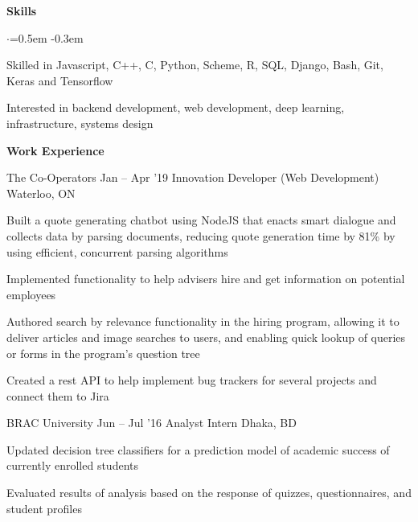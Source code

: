 \documentclass{resume} %
\begin{document}

\begin{rSection}{\textbf{Skills}}
  \vspace {0.3em}
  \begin{list}{$\cdot$}{\leftmargin=0.5em}
    \itemsep -0.3em \vspace{-0.3em}
    \item Skilled in Javascript, C++, C, Python, Scheme, R, SQL, Django, Bash, Git, Keras and Tensorflow
    \item Interested in backend development, web development, deep learning, infrastructure, systems design
  \end{list}
  \vspace{0.3em}
\end{rSection}



\begin{rSection}{\textbf{Work Experience}}
  \begin{rSubsection}{The Co-Operators}
    {Jan -- Apr '19}
         {Innovation Developer (Web Development)}
         {Waterloo, ON}
       \item Built a quote generating chatbot using NodeJS that enacts smart dialogue and collects data by parsing documents, reducing quote generation time by 81\% by using efficient, concurrent parsing algorithms
    \item Implemented functionality to help advisers hire and get information on potential employees
    \item Authored search by relevance functionality in the hiring program, allowing it to deliver articles and image searches to users, and enabling quick lookup of queries or forms in the program's question tree
     \item Created a rest API to help implement bug trackers for several projects and connect them to Jira
  \end{rSubsection}

	\begin{rSubsection}{BRAC University}
		{Jun -- Jul '16}
		{Analyst Intern}
		{Dhaka, BD}
		\item Updated decision tree classifiers for a prediction model of academic success of currently enrolled students
		\item Evaluated results of analysis based on the response of quizzes, questionnaires, and student profiles

	\end{rSubsection}

  
\end{rSection} 
\end{document}
